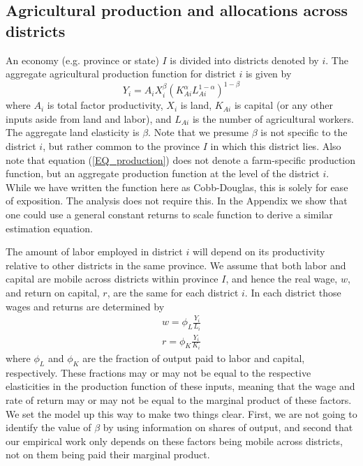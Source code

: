 \documentclass[11pt]{article}
\begin{document}
\subsection{Agricultural production and allocations across districts}
An economy (e.g. province or state) $I$ is divided into districts denoted by $i$. The aggregate agricultural production function for district $i$ is given by 
\begin{equation}
Y_{i} = A_{i} X_{i}^{\beta} \left(K_{Ai}^{\alpha}L_{Ai}^{1-\alpha}\right)^{1-\beta} \label{EQ_production}
\end{equation}
where $A_{i}$ is total factor productivity, $X_{i}$ is land, $K_{Ai}$ is capital (or any other inputs aside from land and labor), and $L_{Ai}$ is the number of agricultural workers. The aggregate land elasticity is $\beta$. Note that we presume $\beta$ is not specific to the district $i$, but rather common to the province $I$ in which this district lies. Also note that equation (\ref{EQ_production}) does not denote a farm-specific production function, but an aggregate production function at the level of the district $i$. While we have written the function here as Cobb-Douglas, this is solely for ease of exposition. The analysis does not require this. In the Appendix we show that one could use a general constant returns to scale function to derive a similar estimation equation.

The amount of labor employed in district $i$ will depend on its productivity relative to other districts in the same province. We assume that both labor and capital are mobile across districts within province $I$, and hence the real wage, $w$, and return on capital, $r$, are the same for each district $i$. In each district those wages and returns are determined by
\begin{eqnarray}
    w = \phi_L \frac{Y_i}{L_i} \\ \nonumber
    r = \phi_K \frac{Y_i}{K_i} \label{EQ_factorprices}
\end{eqnarray}
where $\phi_L$ and $\phi_K$ are the fraction of output paid to labor and capital, respectively. These fractions may or may not be equal to the respective elasticities in the production function of these inputs, meaning that the wage and rate of return may or may not be equal to the marginal product of these factors. We set the model up this way to make two things clear. First, we are not going to identify the value of $\beta$ by using information on shares of output, and second that our empirical work only depends on these factors being mobile across districts, not on them being paid their marginal product.
\end{document}
